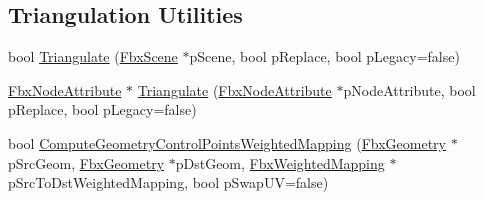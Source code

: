 \subsection*{Triangulation Utilities}
\begin{DoxyCompactItemize}
\item 
bool \hyperlink{class_fbx_geometry_converter_a472eeb2876199b239ce84807a5b4812b}{Triangulate} (\hyperlink{class_fbx_scene}{Fbx\+Scene} $\ast$p\+Scene, bool p\+Replace, bool p\+Legacy=false)
\item 
\hyperlink{class_fbx_node_attribute}{Fbx\+Node\+Attribute} $\ast$ \hyperlink{class_fbx_geometry_converter_aeef7518f4f50b7afc7e7f429eef8aa8d}{Triangulate} (\hyperlink{class_fbx_node_attribute}{Fbx\+Node\+Attribute} $\ast$p\+Node\+Attribute, bool p\+Replace, bool p\+Legacy=false)
\item 
bool \hyperlink{class_fbx_geometry_converter_a3ee0a5af2ed44232dfda82fecd00a875}{Compute\+Geometry\+Control\+Points\+Weighted\+Mapping} (\hyperlink{class_fbx_geometry}{Fbx\+Geometry} $\ast$p\+Src\+Geom, \hyperlink{class_fbx_geometry}{Fbx\+Geometry} $\ast$p\+Dst\+Geom, \hyperlink{class_fbx_weighted_mapping}{Fbx\+Weighted\+Mapping} $\ast$p\+Src\+To\+Dst\+Weighted\+Mapping, bool p\+Swap\+UV=false)
\end{DoxyCompactItemize}
